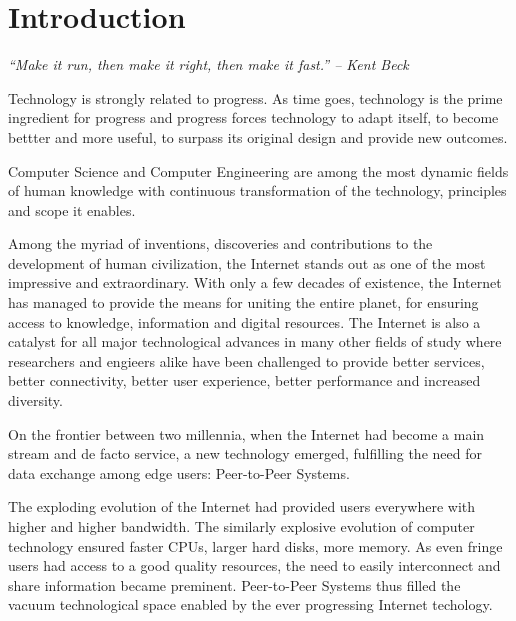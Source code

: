 
\chapter{Introduction}
\label{chapter:intro}

\textit{``Make it run, then make it right, then make it fast.'' -- Kent Beck}

Technology is strongly related to progress. As time goes, technology is the
prime ingredient for progress and progress forces technology to adapt itself,
to become bettter and more useful, to surpass its original design and provide
new outcomes.

Computer Science and Computer Engineering are among the most dynamic fields of
human knowledge with continuous transformation of the technology, principles
and scope it enables.

Among the myriad of inventions, discoveries and contributions to the
development of human civilization, the Internet stands out as one of the
most impressive and extraordinary. With only a few decades of existence, the
Internet has managed to provide the means for uniting the entire planet, for
ensuring access to knowledge, information and digital resources. The Internet
is also a catalyst for all major technological advances in many other fields
of study where researchers and engieers alike have been challenged to provide
better services, better connectivity, better user experience, better
performance and increased diversity.

On the frontier between two millennia, when the Internet had become a main
stream and de facto service, a new technology emerged, fulfilling the need for
data exchange among edge users: Peer-to-Peer Systems.

The exploding evolution of the Internet had provided users everywhere with
higher and higher bandwidth. The similarly explosive evolution of computer
technology ensured faster CPUs, larger hard disks, more memory. As even fringe
users had access to a good quality resources, the need to easily interconnect
and share information became preminent. Peer-to-Peer Systems thus filled the
vacuum technological space enabled by the ever progressing Internet techology.




